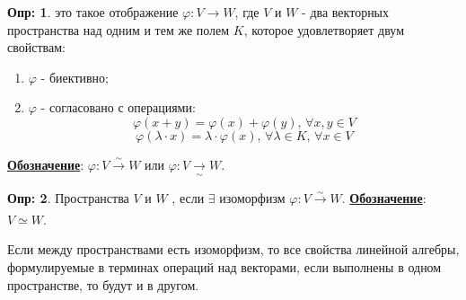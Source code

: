 \documentclass[12pt]{article}
\theoremstyle{definition}
\newtheorem{defn}{Опр:}
\begin{document}
\begin{defn}
	 это такое отображение $\varphi \colon V \to W$, где $V$ и $W$ - два векторных пространства над одним и тем же полем $K$, которое удовлетворяет двум свойствам:
	\begin{enumerate}[label=\arabic*)]
		\item $\varphi$ - биективно;
		\item $\varphi$ - согласовано с операциями: 
		$$
			\varphi(x + y) = \varphi(x) + \varphi(y), \, \forall x,y \in V
		$$
		$$
			\varphi(\lambda{\cdot}x) = \lambda{\cdot}\varphi(x), \, \forall \lambda \in K, \, \forall x \in V
		$$	
	\end{enumerate}
	\textbf{\uline{Обозначение}}: $\varphi \colon V \xrightarrow[]{\sim} W$ или $\varphi \colon V \xrightarrow[\sim]{} W$.
\end{defn}
\begin{defn}
	Пространства $V$ и $W$ , если $\exists$ изоморфизм $\varphi \colon V \xrightarrow[]{\sim} W$. \textbf{\uline{Обозначение}}: $V \simeq W$.
\end{defn}
Если между пространствами есть изоморфизм, то все свойства линейной алгебры, формулируемые в терминах операций над векторами, если выполнены в одном пространстве, то будут и в другом.
\end{document}
